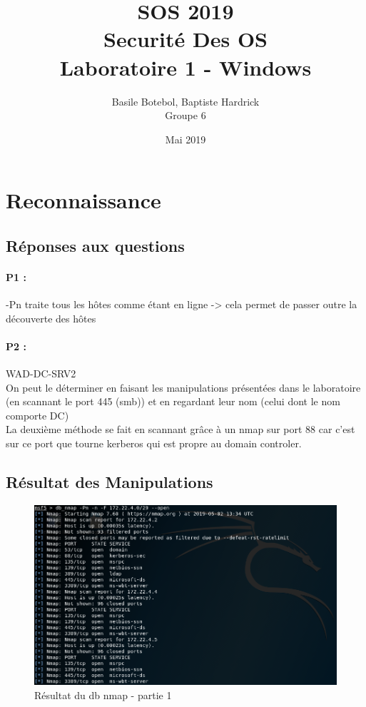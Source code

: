 \documentclass[12pt]{report} %
\title{\textbf{SOS 2019\\Securité Des OS\\Laboratoire 1 - Windows}} %
\author{Basile Botebol, Baptiste Hardrick\\Groupe 6}
\date{Mai 2019} %
\begin{document}
\maketitle

\section*{Reconnaissance}

\subsection*{Réponses aux questions}
\paragraph{P1 :} -Pn traite tous les hôtes comme étant en ligne -> cela permet de passer outre la découverte des hôtes

\paragraph{P2 :} WAD-DC-SRV2\\
On peut le déterminer en faisant les manipulations présentées dans le laboratoire (en scannant le port 445 (smb)) 
et en regardant leur nom (celui dont le nom comporte DC)\\
La deuxième méthode se fait en scannant grâce à un nmap sur port 88 car c'est sur ce port que tourne kerberos qui est 
propre au domain controler.


\subsection*{Résultat des Manipulations}

\begin{figure}[!h]
	\includegraphics[width=17cm]{db_nmap_3_1_a.PNG}
	\caption*{Résultat du db nmap - partie 1}
\end{figure}
\end{document}
